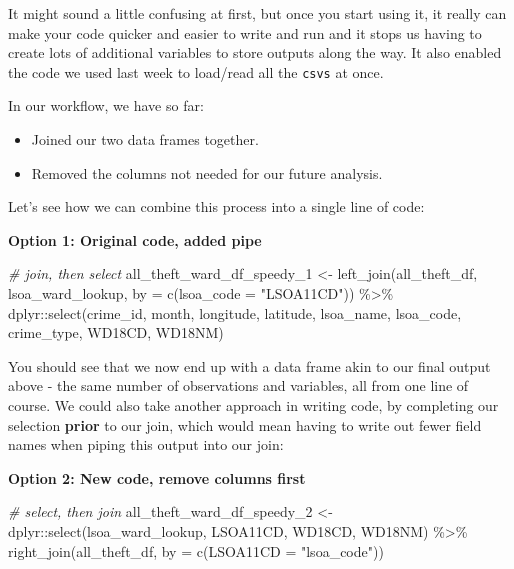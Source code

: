 \documentclass[
]{book}
\newenvironment{Shaded}{\begin{snugshade}}{\end{snugshade}}
\newcommand{\AttributeTok}[1]{\textcolor[rgb]{0.77,0.63,0.00}{#1}}
\newcommand{\CommentTok}[1]{\textcolor[rgb]{0.56,0.35,0.01}{\textit{#1}}}
\newcommand{\FunctionTok}[1]{\textcolor[rgb]{0.00,0.00,0.00}{#1}}
\newcommand{\NormalTok}[1]{#1}
\newcommand{\OtherTok}[1]{\textcolor[rgb]{0.56,0.35,0.01}{#1}}
\newcommand{\SpecialCharTok}[1]{\textcolor[rgb]{0.00,0.00,0.00}{#1}}
\newcommand{\StringTok}[1]{\textcolor[rgb]{0.31,0.60,0.02}{#1}}
\providecommand{\tightlist}{%
  \setlength{\itemsep}{0pt}\setlength{\parskip}{0pt}}
\begin{document}
It might sound a little confusing at first, but once you start using it, it really can make your code quicker and easier to write and run and it stops us having to create lots of additional variables to store outputs along the way. It also enabled the code we used last week to load/read all the \texttt{csvs} at once.

In our workflow, we have so far:

\begin{itemize}
\tightlist
\item
  Joined our two data frames together.
\item
  Removed the columns not needed for our future analysis.
\end{itemize}

Let's see how we can combine this process into a single line of code:

\textbf{Option 1: Original code, added pipe}

\begin{Shaded}
\begin{Highlighting}[]
\CommentTok{\# join, then select}
\NormalTok{all\_theft\_ward\_df\_speedy\_1 }\OtherTok{\textless{}{-}} \FunctionTok{left\_join}\NormalTok{(all\_theft\_df, lsoa\_ward\_lookup, }\AttributeTok{by =} \FunctionTok{c}\NormalTok{(}\AttributeTok{lsoa\_code =} \StringTok{"LSOA11CD"}\NormalTok{)) }\SpecialCharTok{\%\textgreater{}\%}
\NormalTok{    dplyr}\SpecialCharTok{::}\FunctionTok{select}\NormalTok{(crime\_id, month, longitude, latitude, lsoa\_name, lsoa\_code,}
\NormalTok{        crime\_type, WD18CD, WD18NM)}
\end{Highlighting}
\end{Shaded}

You should see that we now end up with a data frame akin to our final output above - the same number of observations and variables, all from one line of course. We could also take another approach in writing code, by completing our selection \textbf{prior} to our join, which would mean having to write out fewer field names when piping this output into our join:

\textbf{Option 2: New code, remove columns first}

\begin{Shaded}
\begin{Highlighting}[]
\CommentTok{\# select, then join}
\NormalTok{all\_theft\_ward\_df\_speedy\_2 }\OtherTok{\textless{}{-}}\NormalTok{ dplyr}\SpecialCharTok{::}\FunctionTok{select}\NormalTok{(lsoa\_ward\_lookup, LSOA11CD, WD18CD,}
\NormalTok{    WD18NM) }\SpecialCharTok{\%\textgreater{}\%}
    \FunctionTok{right\_join}\NormalTok{(all\_theft\_df, }\AttributeTok{by =} \FunctionTok{c}\NormalTok{(}\AttributeTok{LSOA11CD =} \StringTok{"lsoa\_code"}\NormalTok{))}
\end{Highlighting}
\end{Shaded}
\end{document}
